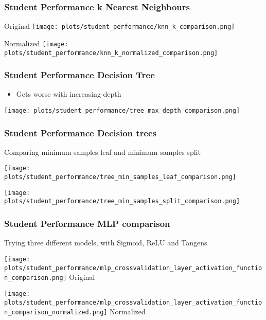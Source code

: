 \documentclass[aspectratio=169]{beamer}
\begin{document}
\begin{frame}{}
\frametitle{Student Performance k Nearest Neighbours}
\begin{minipage}{0.49\textwidth}
    \center Original
    \texttt{[image: plots/student\_performance/knn\_k\_comparison.png]}
\end{minipage}
\begin{minipage}{0.49\textwidth}
    \center Normalized
    \texttt{[image: plots/student\_performance/knn\_k\_normalized\_comparison.png]}
\end{minipage}
\end{frame}

\begin{frame}{}
\frametitle{Student Performance Decision Tree}
\begin{minipage}{0.3\textwidth}
\begin{itemize}
\item  Gets worse with increasing depth
\end{itemize}
\end{minipage}
\begin{minipage}{0.69\textwidth}
    \texttt{[image: plots/student\_performance/tree\_max\_depth\_comparison.png]}
\end{minipage}
\end{frame}

\begin{frame}{}
\frametitle{Student Performance Decision trees }
\center Comparing minimum samples leaf and minimum samples split 
\begin{minipage}{0.49\textwidth}
    \texttt{[image: plots/student\_performance/tree\_min\_samples\_leaf\_comparison.png]}
\end{minipage}
\begin{minipage}{0.49\textwidth}
    \texttt{[image: plots/student\_performance/tree\_min\_samples\_split\_comparison.png]}
\end{minipage}
\end{frame}

\begin{frame}{}
\frametitle{Student Performance MLP comparison}
\center Trying three different models, with Sigmoid, ReLU and Tangens
\begin{minipage}{0.49\textwidth}
    \texttt{[image: plots/student\_performance/mlp\_crossvalidation\_layer\_activation\_function\_comparison.png]}
    \center Original
\end{minipage}
\begin{minipage}{0.49\textwidth}
    \texttt{[image: plots/student\_performance/mlp\_crossvalidation\_layer\_activation\_function\_comparison\_normalized.png]}
    \center Normalized
\end{minipage}
\end{frame}
\end{document}
